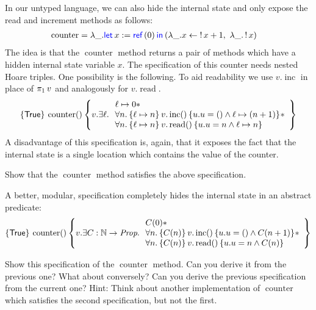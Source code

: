 In our untyped language, we can also hide the internal state and only
expose the read and increment methods as follows:
\begin{align*}
  \operatorname{counter} = \lambda \_ . &\Let x = \Ref(0) in (\lambda \_ . x \gets \deref{x} + 1,\ \lambda \_ . \deref{x})
\end{align*}
The idea is that the $\operatorname{counter}$ method returns a pair of
methods which have a hidden internal state variable $x$.  The
specification of this counter needs nested Hoare triples.  One
possibility is the following.  To aid readability we use
$v.\operatorname{inc}$ in place of $\Proj{1} v$ and analogously for
$v.\operatorname{read}$.  
\begin{align*}
  \hoare{\TRUE}{\operatorname{counter} \TT}
  {v. \Exists \ell . \begin{array}{l}\ell \pointsto 0 \ast\\
                       \All n . \hoare{\ell \pointsto n}{v.\operatorname{inc} \TT}{u.u = \TT \land \ell \pointsto (n + 1)} \ast \\
                       \All n . \hoare{\ell \pointsto n}{v.\operatorname{read} \TT}{u.u = n \land \ell \pointsto n}
                       \end{array}}
\end{align*}
A disadvantage of this specification is,
again, that it exposes the fact that the internal state is a single
location which contains the value of the counter.

\begin{exercise}
  Show that the $\operatorname{counter}$ method satisfies the above specification.
\end{exercise}

%
A better, modular, specification completely hides the internal state in an abstract predicate:
\begin{align}
  \label{eq:counter-example:specification-style-abstract}
  \hoare{\TRUE}{\operatorname{counter} \TT}
  {v. \Exists C : \NN \to \Prop . \begin{array}{l}C(0)\ast\\
                                    \All n . \hoare{C(n)}{v.\operatorname{inc} \TT}{u.u = \TT \land C(n+1)} \ast \\
                                    \All n . \hoare{C(n)}{v.\operatorname{read} \TT}{u.u = n \land C(n)}
                       \end{array}}
\end{align}
\begin{exercise}
  Show this specification of the $\operatorname{counter}$ method.
  Can you derive it from the previous one?
  What about conversely?
  Can you derive the previous specification from the current one?
  Hint: Think about another implementation of $\operatorname{counter}$ which satisfies the second specification, but not the first.
\end{exercise}


